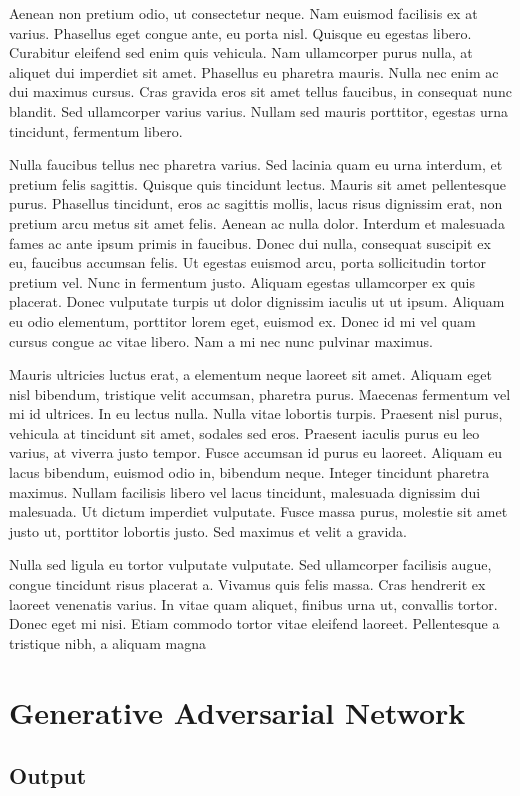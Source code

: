 Aenean non pretium odio, ut consectetur neque. Nam euismod facilisis ex at varius. Phasellus eget congue ante, eu porta nisl. Quisque eu egestas libero. Curabitur eleifend sed enim quis vehicula. Nam ullamcorper purus nulla, at aliquet dui imperdiet sit amet. Phasellus eu pharetra mauris. Nulla nec enim ac dui maximus cursus. Cras gravida eros sit amet tellus faucibus, in consequat nunc blandit. Sed ullamcorper varius varius. Nullam sed mauris porttitor, egestas urna tincidunt, fermentum libero.

Nulla faucibus tellus nec pharetra varius. Sed lacinia quam eu urna interdum, et pretium felis sagittis. Quisque quis tincidunt lectus. Mauris sit amet pellentesque purus. Phasellus tincidunt, eros ac sagittis mollis, lacus risus dignissim erat, non pretium arcu metus sit amet felis. Aenean ac nulla dolor. Interdum et malesuada fames ac ante ipsum primis in faucibus. Donec dui nulla, consequat suscipit ex eu, faucibus accumsan felis. Ut egestas euismod arcu, porta sollicitudin tortor pretium vel. Nunc in fermentum justo. Aliquam egestas ullamcorper ex quis placerat. Donec vulputate turpis ut dolor dignissim iaculis ut ut ipsum. Aliquam eu odio elementum, porttitor lorem eget, euismod ex. Donec id mi vel quam cursus congue ac vitae libero. Nam a mi nec nunc pulvinar maximus.

Mauris ultricies luctus erat, a elementum neque laoreet sit amet. Aliquam eget nisl bibendum, tristique velit accumsan, pharetra purus. Maecenas fermentum vel mi id ultrices. In eu lectus nulla. Nulla vitae lobortis turpis. Praesent nisl purus, vehicula at tincidunt sit amet, sodales sed eros. Praesent iaculis purus eu leo varius, at viverra justo tempor. Fusce accumsan id purus eu laoreet. Aliquam eu lacus bibendum, euismod odio in, bibendum neque. Integer tincidunt pharetra maximus. Nullam facilisis libero vel lacus tincidunt, malesuada dignissim dui malesuada. Ut dictum imperdiet vulputate. Fusce massa purus, molestie sit amet justo ut, porttitor lobortis justo. Sed maximus et velit a gravida.

Nulla sed ligula eu tortor vulputate vulputate. Sed ullamcorper facilisis augue, congue tincidunt risus placerat a. Vivamus quis felis massa. Cras hendrerit ex laoreet venenatis varius. In vitae quam aliquet, finibus urna ut, convallis tortor. Donec eget mi nisi. Etiam commodo tortor vitae eleifend laoreet. Pellentesque a tristique nibh, a aliquam magna

\section{Generative Adversarial Network}
\label{advinterno}

\subsection{Output}
\label{advoutput}

